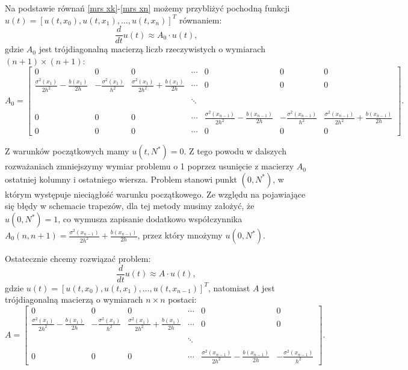 \documentclass{article}
\begin{document}
Na podstawie równań \eqref{mrs xk}-\eqref{mrs xn} możemy przybliżyć pochodną funkcji $u(t) = [u(t, x_{0}), u(t, x_{1}), \dots , u(t, x_{n}) ]^{T}$ równaniem:
\begin{equation*}
\frac{d}{dt}u(t) \approx A_0 \cdot u(t),
\end{equation*}
gdzie $A_0$ jest trójdiagonalną macierzą liczb rzeczywistych o wymiarach $(n+1)\times(n+1)$:
\begin{equation*}
A_0 = \begin{bmatrix}
	0 & 0 & 0 &  \cdots & 0 & 0 & 0
	\\
	\frac{\sigma^{2}(x_{1})}{2 h^{2}} - \frac{b(x_{1})}{2 h} & -\frac{\sigma^{2}(x_{1})}{h^{2}} & \frac{\sigma^{2}(x_{1})}{2 h^{2}} + \frac{b(x_{1})}{2 h} & \cdots & 0 & 0 & 0
	\\
	&  &  &  &  &  & 
	\\
	&  &  & \ddots &  &  & 
	\\
	&  &  &  &  &  & 
	\\
	0 & 0 & 0 & \cdots & \frac{\sigma^{2}(x_{n-1})}{2 h^{2}} - \frac{b(x_{n-1})}{2 h} & -\frac{\sigma^{2}(x_{n-1})}{h^{2}} & \frac{\sigma^{2}(x_{n-1})}{2 h^{2}} + \frac{b(x_{n-1})}{2 h}
	\\
	0 & 0 & 0 & \cdots & 0 & 0 & 0
\end{bmatrix}.
\end{equation*}

Z warunków początkowych mamy $u(t, N^{*}) = 0$. Z tego powodu w dalszych rozważaniach zmniejszymy wymiar problemu o 1 poprzez usunięcie z macierzy $A_0$ ostatniej kolumny i ostatniego wiersza. Problem stanowi punkt $(0,N^{*})$, w którym występuje nieciągłość warunku początkowego. Ze względu na pojawiające się błędy w schemacie trapezów, dla tej metody musimy założyć, że $u(0, N^{*}) = 1$, co wymusza zapisanie dodatkowo współczynnika $A_0(n,n+1) = \frac{\sigma^{2}(x_{n-1})}{2 h^{2}} + \frac{b(x_{n-1})}{2 h}$, przez który mnożymy $u(0, N^{*})$.

Ostatecznie chcemy rozwiązać problem:
\begin{equation*}
\frac{d}{dt}u(t) \approx A \cdot u(t),
\end{equation*}
gdzie $u(t) = [u(t, x_{0}), u(t, x_{1}), \dots , u(t, x_{n-1}) ]^{T}$, natomiast $A$ jest trójdiagonalną macierzą o wymiarach $n\times n$ postaci:
\begin{equation*}
A = \begin{bmatrix}
0 & 0 & 0 &  \cdots & 0 & 0 
\\
\frac{\sigma^{2}(x_{1})}{2 h^{2}} - \frac{b(x_{1})}{2 h} & -\frac{\sigma^{2}(x_{1})}{h^{2}} & \frac{\sigma^{2}(x_{1})}{2 h^{2}} + \frac{b(x_{1})}{2 h} & \cdots & 0 & 0 
\\
&  &  &  &  & 
\\
&  &  & \ddots &  & 
\\
&  &  &  &  & 
\\
0 & 0 & 0 & \cdots & \frac{\sigma^{2}(x_{n-1})}{2 h^{2}} - \frac{b(x_{n-1})}{2 h} & -\frac{\sigma^{2}(x_{n-1})}{h^{2}} 
\end{bmatrix}.
\end{equation*}
\end{document}
